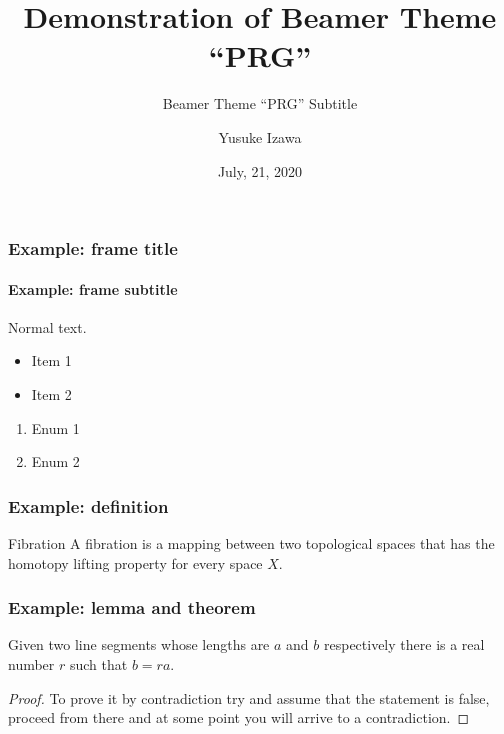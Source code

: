 \documentclass[12pt]{beamer}
\title{Demonstration of Beamer Theme ``PRG''}
\subtitle{Beamer Theme ``PRG'' Subtitle}
\author{Yusuke Izawa}
\date{July, 21, 2020}
\begin{document}
\frame{\maketitle}

\begin{frame}[fragile]
  \frametitle{Example: frame title}
  \framesubtitle{Example: frame subtitle}

  Normal text.

  \begin{itemize}
  \item Item 1
  \item Item 2
  \end{itemize}

  \begin{enumerate}
  \item Enum 1
  \item Enum 2
  \end{enumerate}

\end{frame}

\begin{frame}[fragile]
  \frametitle{Example: definition}

  \theoremstyle{definition}
  \begin{definition}{Fibration}
    A fibration is a mapping between two topological spaces that has the homotopy
    lifting property for every space $X$.
  \end{definition}

\end{frame}

\begin{frame}
  \frametitle{Example: lemma and theorem}

  \begin{lemma}
    Given two line segments whose lengths are $a$ and $b$ respectively there
    is a real number $r$ such that $b=ra$.
  \end{lemma}

  \begin{proof}
    To prove it by contradiction try and assume that the statement is false,
    proceed from there and at some point you will arrive to a contradiction.
  \end{proof}
\end{frame}
\end{document}
